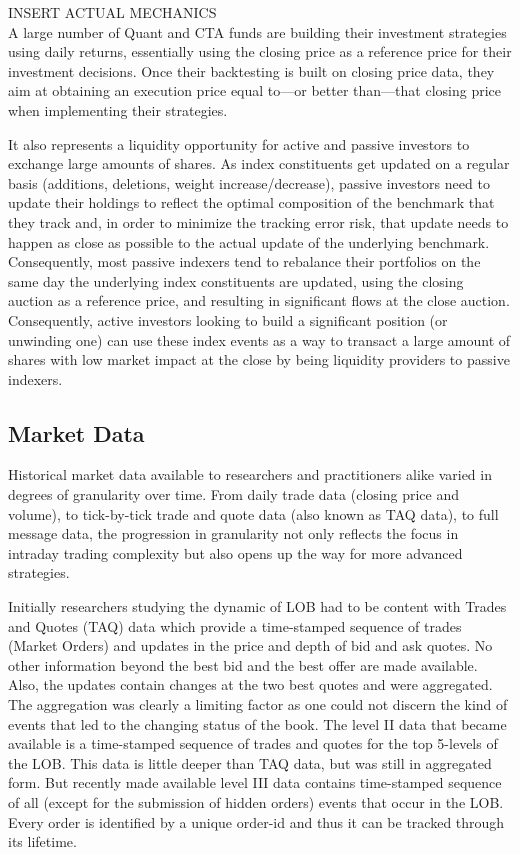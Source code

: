 INSERT ACTUAL MECHANICS \\


A large number of Quant and CTA funds are building their investment strategies using daily returns, essentially using the closing price as a reference price for their investment decisions. Once their backtesting is built on closing price data, they aim at obtaining an execution price equal to---or better than---that closing price when implementing their strategies. 


It also represents a liquidity opportunity for active and passive investors to exchange large amounts of shares. As index constituents get updated on a regular basis (additions, deletions, weight increase/decrease), passive investors need to update their holdings to reflect the optimal composition of the benchmark that they track and, in order to minimize the tracking error risk, that update needs to happen as close as possible to the actual update of the underlying benchmark. Consequently, most passive indexers tend to rebalance their portfolios on the same day the underlying index constituents are updated, using the closing auction as a reference price, and resulting in significant flows at the close auction. Consequently, active investors looking to build a significant position (or unwinding one) can use these index events as a way to transact a large amount of shares with low market impact at the close by being liquidity providers to passive indexers.  



\subsection{Market Data}


Historical market data available to researchers and practitioners alike varied in degrees of granularity over time. From daily trade data (closing price and volume), to tick-by-tick trade and quote data (also known as TAQ data), to full message data, the progression in granularity not only reflects the focus in intraday trading complexity but also opens up the way for more advanced strategies. 


Initially researchers studying the dynamic of LOB had to be content with Trades and Quotes (TAQ) data which provide a time-stamped sequence of trades (Market Orders) and updates in the price and depth of bid and ask quotes. No other information beyond the best bid and the best offer are made available. Also, the updates contain changes at the two best quotes and were aggregated. The aggregation was clearly a limiting factor as one could not discern the kind of events that led to the changing status of the book. The level II data that became available is a time-stamped sequence of trades and quotes for the top 5-levels of the LOB. This data is little deeper than TAQ data, but was still in aggregated form. But recently made available level III data contains time-stamped sequence of all (except for the submission of hidden orders) events that occur in the LOB. Every order is identified by a unique order-id and thus it can be tracked through its lifetime. \\


